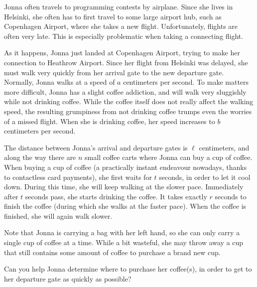 
%
Jonna often travels to programming contests by airplane.
Since she lives in Helsinki, she often has to first travel to some large airport hub, such as Copenhagen Airport, where she takes a new flight.
Unfortunately, flights are often very late.
This is especially problematic when taking a connecting flight.

As it happens, Jonna just landed at Copenhagen Airport, trying to make her connection to Heathrow Airport.
Since her flight from Helsinki was delayed, she must walk very quickly from her arrival gate to the new departure gate.
Normally, Jonna walks at a speed of $a$ centimeters per second.
To make matters more difficult, Jonna has a slight coffee addiction, and will walk very sluggishly while not drinking coffee.
While the coffee itself does not really affect the walking speed, the resulting grumpiness from not drinking coffee trumps even the worries of a missed flight.
When she is drinking coffee, her speed increases to $b$ centimeters per second.

The distance between Jonna's arrival and departure gates is $\ell$ centimeters, and along the way there are $n$ small coffee carts where Jonna can buy a cup of coffee.
When buying a cup of coffee (a practically instant endeavour nowadays, thanks to contactless card payments), she first waits for $t$ seconds, in order to let it cool down.
During this time, she will keep walking at the slower pace.
Immediately after $t$ seconds pass, she starts drinking the coffee.  It takes exactly $r$ seconds to finish the coffee (during which she walks at the faster pace).
When the coffee is finished, she will again walk slower.

Note that Jonna is carrying a bag with her left hand, so she can only carry a single cup of coffee at a time.
While a bit wasteful, she may throw away a cup that still contains some amount of coffee to purchase a brand new cup.

Can you help Jonna determine where to purchase her coffee(s), in order to get to her departure gate as quickly as possible?

